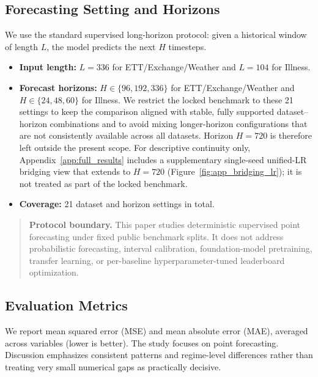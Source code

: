 \documentclass{ieeeaccess}
\begin{document}
\subsection{Forecasting Setting and Horizons}
We use the standard supervised long-horizon protocol: given a historical window of
length $L$, the model predicts the next $H$ timesteps.
\begin{itemize}
    \item \textbf{Input length:} $L=336$ for ETT/Exchange/Weather and $L=104$ for
    Illness.
    \item \textbf{Forecast horizons:} $H \in \{96,192,336\}$ for
    ETT/Exchange/Weather and $H \in \{24,48,60\}$ for Illness. We restrict the
    locked benchmark to these 21 settings to keep the comparison aligned with
    stable, fully supported dataset--horizon combinations and to avoid mixing
    longer-horizon configurations that are not consistently available across all
    datasets. Horizon $H=720$ is therefore left outside the present scope. For
    descriptive continuity only, Appendix~\ref{app:full_results} includes a
    supplementary single-seed unified-LR bridging view that extends to $H=720$
    (Figure~\ref{fig:app_bridging_lr}); it is not treated as part of the locked
    benchmark.
    \item \textbf{Coverage:} 21 dataset and horizon settings in total.
\end{itemize}

\begin{quote}
\textbf{Protocol boundary.} This paper studies deterministic supervised
point forecasting under fixed public benchmark splits. It does not address
probabilistic forecasting, interval calibration, foundation-model pretraining,
transfer learning, or per-baseline hyperparameter-tuned leaderboard optimization.
\end{quote}

\subsection{Evaluation Metrics}
We report mean squared error (MSE) and mean absolute error (MAE), averaged across
variables (lower is better). The study focuses on point forecasting. Discussion
emphasizes consistent patterns and regime-level differences rather than treating very
small numerical gaps as practically decisive.
\end{document}
